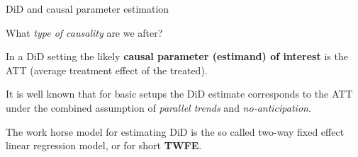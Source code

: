 \documentclass[notes,11pt, aspectratio=169]{beamer}
\newenvironment{wideitemize}{\itemize\addtolength{\itemsep}{10pt}}{\enditemize}
\begin{document}
\begin{frame}{DiD and causal parameter estimation}
        \begin{wideitemize} 
        \item What \emph{type of causality} are we after?
        \item  In a DiD setting the likely \textbf{causal parameter (estimand) of interest} is the ATT (average treatment effect of the treated). 
        
        \item It is well known that for basic setups the DiD estimate corresponds to the ATT under the combined assumption of \textit{parallel trends} and \textit{no-anticipation}. 
        
        \item The work horse model for estimating DiD is the so called two-way fixed effect linear regression model, or for short \textbf{TWFE}. 
        \end{wideitemize}
    \end{frame}
\end{document}
